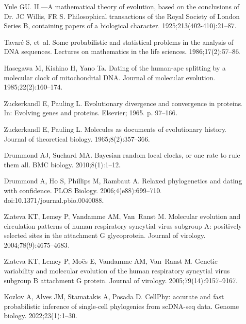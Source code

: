 \documentclass[10pt,letterpaper,table]{article}
\theoremstyle{definition}
\begin{document}
\begin{thebibliography}{10}
Yule GU.
\newblock II.---A mathematical theory of evolution, based on the conclusions of
  Dr. JC Willis, FR S.
\newblock Philosophical transactions of the Royal Society of London Series B,
  containing papers of a biological character. 1925;213(402-410):21--87.

Tavar{\'e} S, et~al.
\newblock Some probabilistic and statistical problems in the analysis of DNA
  sequences.
\newblock Lectures on mathematics in the life sciences. 1986;17(2):57--86.

Hasegawa M, Kishino H, Yano Ta.
\newblock Dating of the human-ape splitting by a molecular clock of
  mitochondrial DNA.
\newblock Journal of molecular evolution. 1985;22(2):160--174.

Zuckerkandl E, Pauling L.
\newblock Evolutionary divergence and convergence in proteins.
\newblock In: Evolving genes and proteins. Elsevier; 1965. p. 97--166.

Zuckerkandl E, Pauling L.
\newblock Molecules as documents of evolutionary history.
\newblock Journal of theoretical biology. 1965;8(2):357--366.

Drummond AJ, Suchard MA.
\newblock Bayesian random local clocks, or one rate to rule them all.
\newblock BMC biology. 2010;8(1):1--12.

Drummond A, Ho S, Phillips M, Rambaut A.
\newblock Relaxed phylogenetics and dating with confidence.
\newblock PLOS Biology. 2006;4(e88):699--710.
\newblock doi:{10.1371/journal.pbio.0040088}.

Zlateva KT, Lemey P, Vandamme AM, Van~Ranst M.
\newblock Molecular evolution and circulation patterns of human respiratory
  syncytial virus subgroup A: positively selected sites in the attachment G
  glycoprotein.
\newblock Journal of virology. 2004;78(9):4675--4683.

Zlateva KT, Lemey P, Mo{\"e}s E, Vandamme AM, Van~Ranst M.
\newblock Genetic variability and molecular evolution of the human respiratory
  syncytial virus subgroup B attachment G protein.
\newblock Journal of virology. 2005;79(14):9157--9167.

Kozlov A, Alves JM, Stamatakis A, Posada D.
\newblock CellPhy: accurate and fast probabilistic inference of single-cell
  phylogenies from scDNA-seq data.
\newblock Genome biology. 2022;23(1):1--30.


\end{thebibliography}
\end{document}
